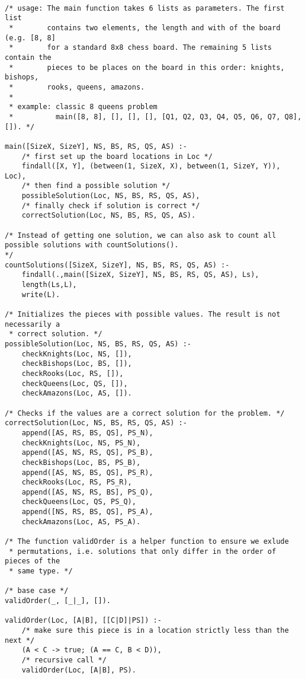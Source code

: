 \documentclass{article}
\begin{document}
\begin{verbatim}

/* usage: The main function takes 6 lists as parameters. The first list
 *        contains two elements, the length and with of the board (e.g. [8, 8]
 *        for a standard 8x8 chess board. The remaining 5 lists contain the
 *        pieces to be places on the board in this order: knights, bishops,
 *        rooks, queens, amazons.
 *
 * example: classic 8 queens problem
 *          main([8, 8], [], [], [], [Q1, Q2, Q3, Q4, Q5, Q6, Q7, Q8], []). */

main([SizeX, SizeY], NS, BS, RS, QS, AS) :-
	/* first set up the board locations in Loc */
	findall([X, Y], (between(1, SizeX, X), between(1, SizeY, Y)), Loc),
	/* then find a possible solution */
	possibleSolution(Loc, NS, BS, RS, QS, AS),
	/* finally check if solution is correct */
	correctSolution(Loc, NS, BS, RS, QS, AS).

/* Instead of getting one solution, we can also ask to count all possible solutions with countSolutions().
*/
countSolutions([SizeX, SizeY], NS, BS, RS, QS, AS) :-
	findall(.,main([SizeX, SizeY], NS, BS, RS, QS, AS), Ls),
	length(Ls,L),
	write(L).

/* Initializes the pieces with possible values. The result is not necessarily a
 * correct solution. */
possibleSolution(Loc, NS, BS, RS, QS, AS) :-
	checkKnights(Loc, NS, []),
	checkBishops(Loc, BS, []),
	checkRooks(Loc, RS, []),
	checkQueens(Loc, QS, []),
	checkAmazons(Loc, AS, []).

/* Checks if the values are a correct solution for the problem. */
correctSolution(Loc, NS, BS, RS, QS, AS) :-
	append([AS, RS, BS, QS], PS_N),
	checkKnights(Loc, NS, PS_N),
	append([AS, NS, RS, QS], PS_B),
	checkBishops(Loc, BS, PS_B),
	append([AS, NS, BS, QS], PS_R),
	checkRooks(Loc, RS, PS_R),
	append([AS, NS, RS, BS], PS_Q),
	checkQueens(Loc, QS, PS_Q),
	append([NS, RS, BS, QS], PS_A),
	checkAmazons(Loc, AS, PS_A).

/* The function validOrder is a helper function to ensure we exlude
 * permutations, i.e. solutions that only differ in the order of pieces of the
 * same type. */

/* base case */
validOrder(_, [_|_], []).

validOrder(Loc, [A|B], [[C|D]|PS]) :-
	/* make sure this piece is in a location strictly less than the next */
	(A < C -> true; (A == C, B < D)),
	/* recursive call */
	validOrder(Loc, [A|B], PS).


\end{verbatim}
\end{document}
